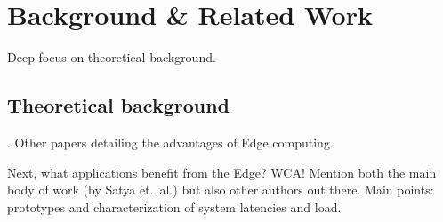 \chapter{Background \& Related Work}

Deep focus on theoretical background.

\section{Theoretical background}
\textcite{Satya2009Case}.
Other papers detailing the advantages of Edge computing.

Next, what applications benefit from the Edge?
\gls{WCA}! Mention both the main body of work (by Satya et.\ al.) but also other authors out there.
Main points: prototypes and characterization of system latencies and load.
